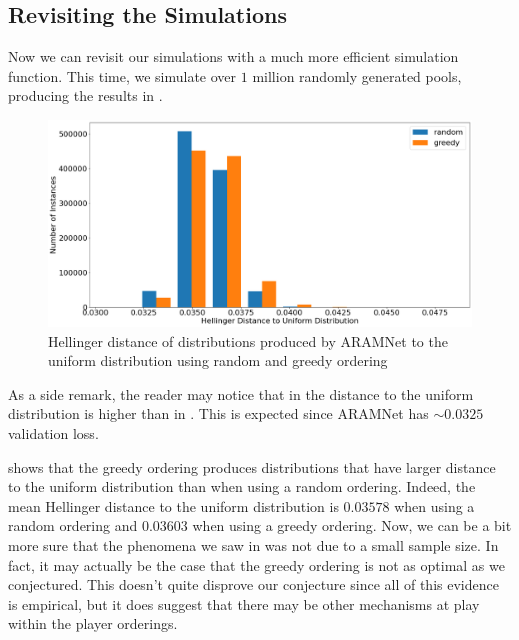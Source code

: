 \subsection{Revisiting the Simulations}

Now we can revisit our simulations with a much more efficient simulation function.
This time, we simulate over $1$ million randomly generated pools, producing the results in .
\begin{figure}[htbp]
    \centering
    \includegraphics[width=.9\textwidth]{figures/simulations-updated.png}
    \caption{Hellinger distance of distributions produced by ARAMNet to the uniform distribution using random and greedy ordering}
    \label{Figure:simulation-updated-results-histogram}
\end{figure}
As a side remark, the reader may notice that in  the distance to the uniform distribution is higher than in .
This is expected since ARAMNet has ${\sim}0.0325$ validation loss.

 shows that the greedy ordering produces distributions that have larger distance to the uniform distribution than when using a random ordering.
Indeed, the mean Hellinger distance to the uniform distribution is $0.03578$ when using a random ordering and $0.03603$ when using a greedy ordering.
Now, we can be a bit more sure that the phenomena we saw in  was not due to a small sample size.
In fact, it may actually be the case that the greedy ordering is not as optimal as we conjectured.
This doesn't quite disprove our conjecture since all of this evidence is empirical, but it does suggest that there may be other mechanisms at play within the player orderings.
